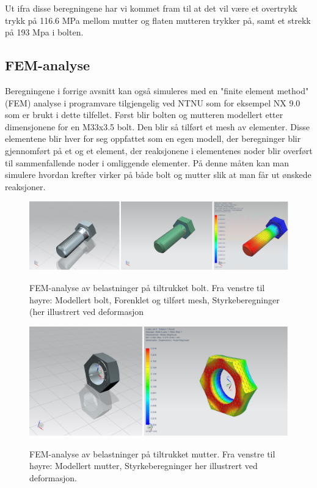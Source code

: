 Ut ifra disse beregningene har vi kommet fram til at det vil være et overtrykk trykk på 116.6 MPa mellom mutter og flaten mutteren trykker på, samt et strekk på 193 Mpa i bolten.

\subsection{FEM-analyse}

Beregningene i forrige avsnitt kan også simuleres med en "finite element method" (FEM) analyse i programvare tilgjengelig ved NTNU som for eksempel NX 9.0 som er brukt i dette tilfellet. Først blir bolten og mutteren modellert etter dimensjonene for en M33x3.5 bolt. Den blir så tilført et mesh av elementer. Disse elementene blir hver for seg oppfattet som en egen modell, der beregninger blir gjennomført på et og et element, der reaksjonene i elementenes noder blir overført til sammenfallende noder i omliggende elementer. På denne måten kan man simulere hvordan krefter virker på både bolt og mutter slik at man får ut ønskede reaksjoner.

\begin{figure}[H]
		\centering
		\includegraphics[width=1.00\textwidth]{images/Rapportbilde_skrue.png}
		\label{fig:FEMskrue}
		\caption{FEM-analyse av belastninger på tiltrukket bolt. Fra venstre til høyre: Modellert bolt, Forenklet og tilført mesh, Styrkeberegninger (her illustrert ved deformasjon}
	\end{figure}
\begin{figure}[H]
		\centering
		\includegraphics[width=1.00\textwidth]{images/Rapportbilde_mutter.png}
		\label{fig:FEMmutter}
		\caption{FEM-analyse av belastninger på tiltrukket mutter. Fra venstre til høyre: Modellert mutter, Styrkeberegninger her illustrert ved deformasjon.}
	\end{figure}

 